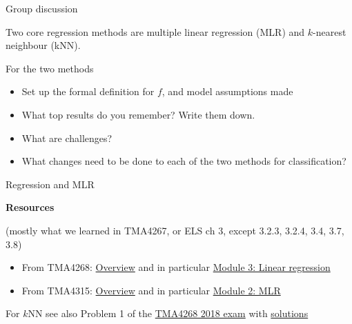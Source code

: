 \documentclass[
  ignorenonframetext,
]{beamer}
\providecommand{\tightlist}{%
  \setlength{\itemsep}{0pt}\setlength{\parskip}{0pt}}
\begin{document}
\begin{frame}

\begin{block}{Group discussion}

Two core regression methods are multiple linear regression (MLR) and
\(k\)-nearest neighbour (kNN).

For the two methods

\begin{itemize}
\tightlist
\item
  Set up the formal definition for \(f\), and model assumptions made
\item
  What top results do you remember? Write them down.
\item
  What are challenges?
\item
  What changes need to be done to each of the two methods for
  classification?
\end{itemize}

\end{block}

\end{frame}

\begin{frame}

\begin{block}{Regression and MLR}

\textbf{Resources}

(mostly what we learned in TMA4267, or ELS ch 3, except 3.2.3, 3.2.4,
3.4, 3.7, 3.8)

\begin{itemize}
\tightlist
\item
  From TMA4268:
  \href{https://www.math.ntnu.no/emner/TMA4268/2019v/TMA4268overview.html}{Overview}
  and in particular
  \href{https://www.math.ntnu.no/emner/TMA4268/2019v/3LinReg/3LinReg.html}{Module
  3: Linear regression}
\item
  From TMA4315:
  \href{https://www.math.ntnu.no/emner/TMA4315/2018h/TMA4315overviewH2018.html}{Overview}
  and in particular
  \href{https://www.math.ntnu.no/emner/TMA4315/2018h/2MLR.html}{Module
  2: MLR}
\end{itemize}

For \(k\)NN see also Problem 1 of the
\href{https://www.math.ntnu.no/emner/TMA4268/Exam/V2018e.pdf}{TMA4268
2018 exam} with
\href{https://www.math.ntnu.no/emner/TMA4268/Exam/e2018sol.pdf}{solutions}

\end{block}

\end{frame}
\end{document}
